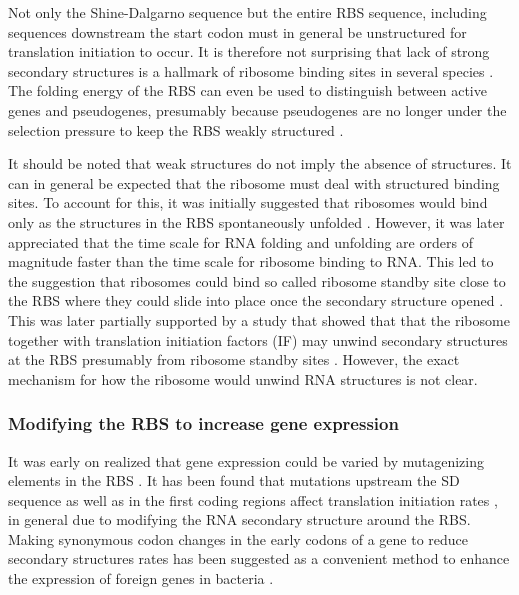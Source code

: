 Not only the Shine-Dalgarno sequence but the entire RBS sequence, including
sequences downstream the start codon \cite{seo_quantitative_2009} must in
general be unstructured for translation initiation to occur. It is therefore not
surprising that lack of strong secondary structures is a hallmark of ribosome
binding sites in several species \cite{gu_universal_2010}. The folding energy
of the RBS can even be used to distinguish between active genes and
pseudogenes, presumably because pseudogenes are no longer under the selection
pressure to keep the RBS weakly structured \cite{keller_reduced_2012}.

It should be noted that weak structures do not imply the absence of structures.
It can in general be expected that the ribosome must deal with structured
binding sites. To account for this, it was initially suggested that ribosomes
would bind only as the structures in the RBS spontaneously unfolded
\cite{de_smit_translational_1994}. However, it was later appreciated that the
time scale for RNA folding and unfolding are orders of magnitude faster than
the time scale for ribosome binding to RNA. This led to the suggestion that
ribosomes could bind so called ribosome standby site close to the RBS where
they could slide into place once the secondary structure opened
\cite{de_smit_translational_2003-1}. This was later partially supported by a
study that showed that that the ribosome together with translation initiation
factors (IF) may unwind secondary structures at the RBS presumably from
ribosome standby sites \cite{studer_unfolding_2006}. However, the exact
mechanism for how the ribosome would unwind RNA structures is not clear.

\subsubsection{Modifying the RBS to increase gene expression}
It was early on realized that gene expression could be varied by mutagenizing
elements in the RBS \cite{warburton_increased_1983}. It has been found that
mutations upstream the SD sequence as well as in the first coding regions
affect translation initiation rates \cite{park_design_2007}
\cite{care_translation_2007}, in general due to modifying the RNA secondary
structure around the RBS. Making synonymous codon changes in the early codons
of a gene to reduce secondary structures rates has been suggested as a
convenient method to enhance the expression of foreign genes in bacteria
\cite{cebe_rapid_2006}.

